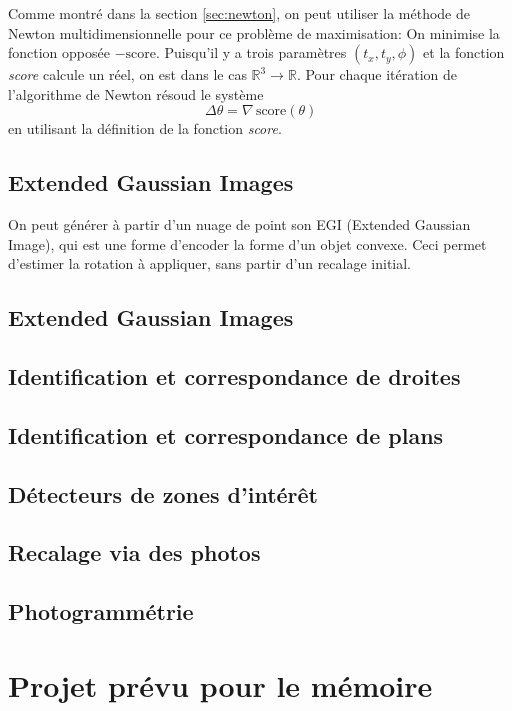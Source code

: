 \documentclass[a4paper,10pt]{scrreprt}
\begin{document}
Comme montré dans la section \ref{sec:newton}, on peut utiliser la méthode de Newton multidimensionnelle pour ce problème de maximisation: On minimise la fonction opposée $- \text{score}$. Puisqu'il y a trois paramètres $(t_x, t_y, \phi)$ et la fonction \emph{score} calcule un réel, on est dans le cas $\mathbb{R}^3 \rightarrow \mathbb{R}$. Pour chaque itération de l'algorithme de Newton résoud le système
\begin{equation}
	[\mathbf{H} \, \text{score}(\theta)] \, \Delta \theta = \nabla \, \text{score}(\theta)
\end{equation}
en utilisant la définition de la fonction \emph{score}.

\section{Extended Gaussian Images}
On peut générer à partir d'un nuage de point son EGI (Extended Gaussian Image), qui est une forme d'encoder la forme d'un objet convexe. Ceci permet d'estimer la rotation à appliquer, sans partir d'un recalage initial.




\section{Extended Gaussian Images}

\section{Identification et correspondance de droites}

\section{Identification et correspondance de plans}

\section{Détecteurs de zones d'intérêt}

\section{Recalage via des photos}

\section{Photogrammétrie}

\chapter{Projet prévu pour le mémoire}



\end{document}

